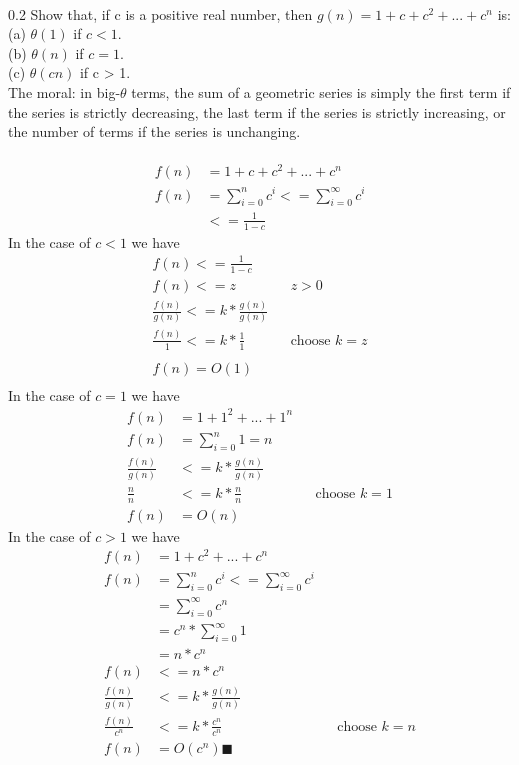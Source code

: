 \documentclass[10pt,a4paper]{article}
\begin{document}
\paragraph{}
0.2
Show that, if c is a positive real number, then $g(n) = 1 + c + c^2 + ... + c^n$ is:\\
(a) $\theta(1)$ if $c < 1$.\\
(b) $\theta(n)$ if $c = 1$.\\
(c) $\theta(cn)$ if c > 1.\\
The moral: in big-$\theta$ terms, the sum of a geometric series is simply the first term if the series is
strictly decreasing, the last term if the series is strictly increasing, or the number of terms if the
series is unchanging.
\paragraph{}
\begin{align*}
	f(n) &= 1 + c + c^2 + ... + c^n\\
	f(n) &= \sum_{i=0}^{n} {c^i} <= \sum_{i=0}^{\infty} {c^i}\\
	&<=\frac{1}{1-c}
\end{align*}
In the case of $c<1$ we have
\begin{align*}
	f(n) <= \frac{1}{1-c}\\
	f(n) <= z &&z > 0\\
	\frac{f(n)}{g(n)}<=k*\frac{g(n)}{g(n)}\\
	\frac{f(n)}{1}<=k*\frac{1}{1}&&\text{choose $k=z$}\\\\
	f(n) = O(1)\\
\end{align*}
In the case of $c=1$ we have
\begin{align*}
	f(n) &= 1 + 1^2 + ... + 1^n\\
	f(n) &= \sum_{i=0}^{n}{1} = n\\
	\frac{f(n)}{g(n)}&<=k*\frac{g(n)}{g(n)}\\
	\frac{n}{n}&<=k*\frac{n}{n}&&\text{choose $k=1$}\\
	f(n) &= O(n)
\end{align*}
In the case of $c>1$ we have
\begin{align*}
	f(n) &= 1 + c^2 + ... + c^n\\
	f(n) &= \sum_{i=0}^{n} {c^i} <= \sum_{i=0}^{\infty} {c^i}\\
	&=\sum_{i=0}^{\infty} {c^n}\\
	&=c^n*\sum_{i=0}^{\infty} {1}\\
	&=n*c^n\\
	f(n)&<=n*c^n\\
	\frac{f(n)}{g(n)}&<=k*\frac{g(n)}{g(n)}\\
	\frac{f(n)}{c^n}&<=k*\frac{c^n}{c^n} &&\text{choose $k=n$}\\
	f(n) &= O(c^n)
	\blacksquare
\end{align*}
\end{document}

